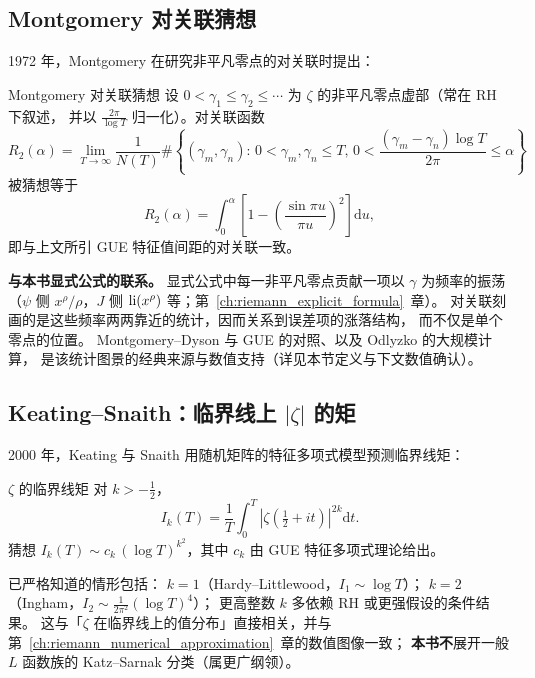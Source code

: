 \subsection{Montgomery 对关联猜想}

1972 年，Montgomery 在研究非平凡零点的对关联时提出：

\begin{definition}{Montgomery 对关联猜想}{}
设 $0 < \gamma_1 \leq \gamma_2 \leq \cdots$ 为 $\zeta$ 的非平凡零点虚部（常在 RH 下叙述，
并以 $\tfrac{2\pi}{\log T}$ 归一化）。对关联函数
\[
  R_2(\alpha) = \lim_{T\to\infty} \frac{1}{N(T)}
  \#\!\left\{(\gamma_m,\gamma_n):\, 0 < \gamma_m, \gamma_n \leq T,\, 0<\frac{(\gamma_m-\gamma_n)\log T}{2\pi}\leq\alpha\right\}
\]
被猜想等于
\[
  R_2(\alpha) = \int_0^\alpha \left[1 - \left(\frac{\sin\pi u}{\pi u}\right)^2\right]\mathrm{d}u,
\]
即与上文所引 GUE 特征值间距的对关联一致。
\end{definition}

\begin{explainframe}
\noindent\textbf{与本书显式公式的联系。}
显式公式中每一非平凡零点贡献一项以 $\gamma$ 为频率的振荡
（$\psi$ 侧 $x^{\rho}/\rho$，$J$ 侧 $\operatorname{li}(x^{\rho})$ 等；第~\ref{ch:riemann_explicit_formula}~章）。
对关联刻画的是这些频率两两靠近的统计，因而关系到误差项的涨落结构，
而不仅是单个零点的位置。
Montgomery--Dyson 与 GUE 的对照、以及 Odlyzko 的大规模计算，
是该统计图景的经典来源与数值支持（详见本节定义与下文数值确认）。
\end{explainframe}

\subsection{Keating--Snaith：临界线上 $|\zeta|$ 的矩}

2000 年，Keating 与 Snaith 用随机矩阵的特征多项式模型预测临界线矩：

\begin{definition}{$\zeta$ 的临界线矩}{}
对 $k>-\tfrac{1}{2}$，
\[
  I_k(T) = \frac{1}{T}\int_0^T \left|\zeta\!\left(\tfrac{1}{2}+it\right)\right|^{2k} \mathrm{d}t.
\]
猜想 $I_k(T) \sim c_k\,(\log T)^{k^2}$，其中 $c_k$ 由 GUE 特征多项式理论给出。
\end{definition}

已严格知道的情形包括：
$k=1$（Hardy--Littlewood，$I_1\sim\log T$）；
$k=2$（Ingham，$I_2\sim \tfrac{1}{2\pi^2}(\log T)^4$）；
更高整数 $k$ 多依赖 RH 或更强假设的条件结果。
这与「$\zeta$ 在临界线上的值分布」直接相关，并与第~\ref{ch:riemann_numerical_approximation}~章的数值图像一致；
\textbf{本书不}展开一般 $L$ 函数族的 Katz--Sarnak 分类（属更广纲领）。

